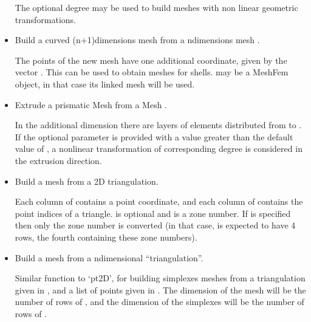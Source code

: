 \documentclass[a4paper,11pt,english]{sphinxmanual}
\begin{document}
\begin{fulllineitems}
\begin{itemize}
The optional degree may be used to build meshes with non linear
geometric transformations.

\item {} 
Build a curved (n+1)\sphinxhyphen{}dimensions mesh from a n\sphinxhyphen{}dimensions mesh .

The points of the new mesh have one additional coordinate, given by
the vector . This can be used to obtain meshes for shells.  may
be a MeshFem object, in that case its linked mesh will be used.

\item {} 
Extrude a prismatic Mesh  from a Mesh .

In the additional dimension there are  layers of elements
distributed from  to .
If the optional parameter  is provided with a value greater
than the default value of , a non\sphinxhyphen{}linear transformation of
corresponding degree is considered in the extrusion direction.

\item {} 
Build a mesh from a 2D triangulation.

Each column of  contains a point coordinate, and each column of 
contains the point indices of a triangle.  is optional and is a
zone number. If  is specified then only the zone number  is
converted (in that case,  is expected to have 4 rows, the fourth
containing these zone numbers).

\item {} 
Build a mesh from a n\sphinxhyphen{}dimensional “triangulation”.

Similar function to ‘pt2D’, for building simplexes meshes from a
triangulation given in , and a list of points given in . The
dimension of the mesh will be the number of rows of , and the
dimension of the simplexes will be the number of rows of .


\end{itemize}
\end{fulllineitems}
\end{document}

